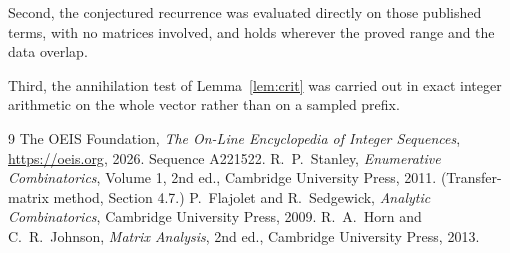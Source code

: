\documentclass[11pt,a4paper]{article}
\theoremstyle{plain}
\theoremstyle{definition}
\begin{document}
Second, the conjectured recurrence was evaluated directly on those published terms, with no
matrices involved, and holds wherever the proved range and the data overlap.

Third, the annihilation test of Lemma~\ref{lem:crit} was carried out in exact integer
arithmetic on the whole vector rather than on a sampled prefix.

\begin{thebibliography}{9}
 The OEIS Foundation, \emph{The On-Line Encyclopedia of Integer
Sequences}, \url{https://oeis.org}, 2026. Sequence A221522.
 R.~P.~Stanley, \emph{Enumerative Combinatorics}, Volume 1, 2nd ed.,
Cambridge University Press, 2011. (Transfer-matrix method, Section 4.7.)
 P.~Flajolet and R.~Sedgewick, \emph{Analytic Combinatorics}, Cambridge
University Press, 2009.
 R.~A.~Horn and C.~R.~Johnson, \emph{Matrix Analysis}, 2nd ed., Cambridge
University Press, 2013.
\end{thebibliography}
\end{document}
